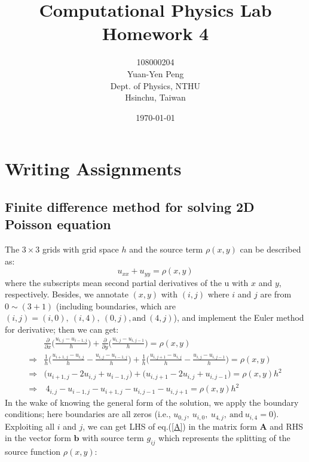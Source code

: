 \documentclass[12pt]{article}
\begin{document}
\title{\textbf{{\normalsize Computational Physics Lab}\\
                Homework 4}}
\author{108000204\\
        Yuan-Yen Peng\\
        Dept. of Physics, NTHU\\
        Hsinchu, Taiwan}
\date{\today}
\maketitle

\section{Writing Assignments}
    \subsection{Finite difference method for solving 2D Poisson equation}
    The $3 \times 3$ grids with grid space $h$ and the source term $\rho(x,y)$ can be described as:
    \[
        u_{xx} + u_{yy} = \rho(x,y)
    \]
    where the subscripts mean second partial derivatives of the u with $x$ and $y$, respectively. Besides, we annotate $(x,y)$ with $(i,j)$ where $i$ and $j$ are from $0 \sim (3+1)$ (including boundaries, which are $(i,j) = (i,0),\ (i,4),\ (0,j),\text{and}\ (4,j)$), and implement the Euler method for derivative; then we can get:
    \begin{align*}
        &\frac{\partial}{\partial x}\Big( \frac{u_{i,j} - u_{i-1,j}}{h} \Big) + \frac{\partial}{\partial y}\Big( \frac{u_{i,j} - u_{i,j-1}}{h} \Big) = \rho(x,y) \\
        \Rightarrow &\frac{1}{h} \Big( \frac{u_{i+1,j} - u_{i,j}}{h} - \frac{u_{i,j} - u_{i-1,j}}{h} \Big) + \frac{1}{h} \Big( \frac{u_{i,j+1} - u_{i,j}}{h} - \frac{u_{i,j} - u_{i,j-1}}{h} \Big) = \rho(x,y) \\
        \Rightarrow &\big( u_{i+1,j} - 2u_{i,j} + u_{i-1,j} \big) + \big( u_{i,j+1} - 2u_{i,j} + u_{i,j-1} \big) = \rho(x,y) h^{2} \\
        \Rightarrow&\ 4_{i,j} - u_{i-1,j} - u_{i+1,j} - u_{i,j-1} - u_{i,j+1} = \rho(x,y) h^{2} \tag{I}\label{A}
    \end{align*}
    In the wake of knowing the general form of the solution, we apply the boundary conditions; here boundaries are all zeros (i.e., $u_{0,j},\ u_{i,0},\ u_{4,j},\ \text{and}\ u_{i,4} = 0$). Exploiting all $i$ and $j$, we can get LHS of eq.(\ref{A}) in the matrix form $\mathbf{A}$ and RHS in the vector form $\mathbf{b}$ with source term $g_{ij}$ which represents the splitting of the source function $\rho(x,y)$:
\end{document}
